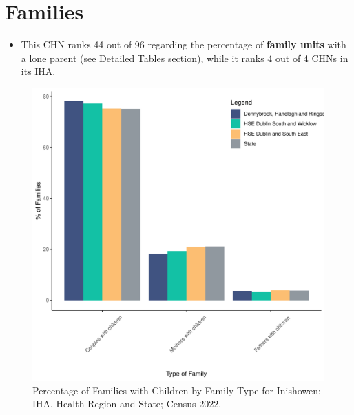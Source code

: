 \documentclass{article}
\begin{document}
\section{Families}\label{sect:Fam}
\begin{itemize}
\item This CHN ranks  44 out of 96 regarding the percentage of \textbf{family units} with a lone parent (see Detailed Tables section), while it ranks   4 out of 4 CHNs in its IHA.
\end{itemize}
\begin{figure}[H]
	\centering
	\includegraphics[width = 150mm]{../figures/FamED.pdf}
	\caption{Percentage of Families with Children by Family Type for Inishowen; IHA, Health Region and State; Census 2022.}
	\label{fig:vbnv}
	\end{figure}
	
\end{document}

